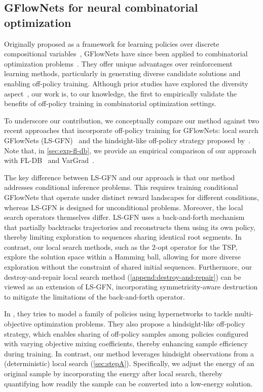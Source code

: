 \documentclass[twoside]{article}
\theoremstyle{plain}
\theoremstyle{definition}
\theoremstyle{remark}
\begin{document}
\subsection{GFlowNets for neural combinatorial optimization}


Originally proposed as a framework for learning policies over discrete compositional variables~\citep{bengio2021flow}, GFlowNets have since been applied to combinatorial optimization problems~\citep{zhang2023let,zhang2022robust}. They offer unique advantages over reinforcement learning methods, particularly in generating diverse candidate solutions and enabling off-policy training. Although prior studies have explored the diversity aspect~\citep{zhang2023let,zhang2022robust}, our work is, to our knowledge, the first to empirically validate the benefits of off-policy training in combinatorial optimization settings.

To underscore our contribution, we conceptually compare our method against two recent approaches that incorporate off-policy training for GFlowNets: local search GFlowNets (LS-GFN)~\citep[LS-GFN;][]{kim2023local} and the hindsight-like off-policy strategy proposed by~\citet{zhu2023sample}. Note that, in \cref{sec:exp-fl-db}, we provide an empirical comparison of our approach with FL-DB~\citep{zhang2023let} and VarGrad~\citep{zhang2022robust}.

The key difference between LS-GFN and our approach is that our method addresses conditional inference problems. This requires training conditional GFlowNets that operate under distinct reward landscapes for different conditions, whereas LS-GFN is designed for unconditional problems. Moreover, the local search operators themselves differ. LS-GFN uses a back-and-forth mechanism that partially backtracks trajectories and reconstructs them using its own policy, thereby limiting exploration to sequences sharing identical root segments. In contrast, our local search methods, such as the 2-opt operator for the TSP, explore the solution space within a Hamming ball, allowing for more diverse exploration without the constraint of shared initial sequences. Furthermore, our destroy-and-repair local search method (\cref{append:destroy-and-repair}) can be viewed as an extension of LS-GFN, incorporating symmetricity-aware destruction to mitigate the limitations of the back-and-forth operator.

In \citet{zhu2023sample}, they tries to model a family of policies using hypernetworks to tackle multi-objective optimization problems. They also propose a hindsight-like off-policy strategy, which enables sharing of off-policy samples among policies configured with varying objective mixing coefficients, thereby enhancing sample efficiency during training. In contrast, our method leverages hindsight observations from a (deterministic) local search (\cref{sec:stepA}). Specifically, we adjust the energy of an original sample by incorporating the energy after local search, thereby quantifying how readily the sample can be converted into a low-energy solution.
\end{document}

